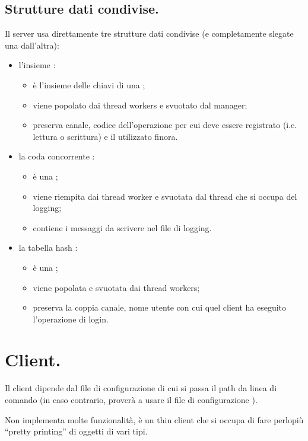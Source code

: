 \documentclass[11pt, italian, openany]{book}
\begin{document}
\begin{sloppypar}
\subsection*{Strutture dati condivise.}
Il server usa direttamente tre strutture dati condivise (e completamente slegate una dall'altra):
\begin{itemize}[topsep=0pt, itemsep=0pt, parsep=0pt]
	\item l'insieme :
	\begin{itemize}
		\item \`e l'insieme delle chiavi di una ;
		\item viene popolato dai thread workers e svuotato dal manager;
		\item preserva canale, codice dell'operazione per cui deve essere registrato (i.e. lettura o scrittura) e il 
		utilizzato finora.
	\end{itemize}
	\item la coda concorrente :
	\begin{itemize}
		\item \`e una ;
		\item viene riempita dai thread worker e svuotata dal thread che si occupa del logging;
		\item contiene i messaggi da scrivere nel file di logging.
	\end{itemize}
	\item la tabella hash :
	\begin{itemize}
		\item \`e una ;
		\item viene popolata e svuotata dai thread workers;
		\item preserva la coppia canale, nome utente con cui quel client ha eseguito l'operazione di login.
	\end{itemize}
\end{itemize}

\section{Client.}
Il client dipende dal file di configurazione di cui si passa il path da linea di comando (in caso
contrario, prover\`a a usare il file di configurazione ).

Non implementa molte funzionalit\`a, \`e un thin client che si occupa di fare perlopi\`u ``pretty printing'' di oggetti di vari tipi.


\end{sloppypar}
\end{document}
